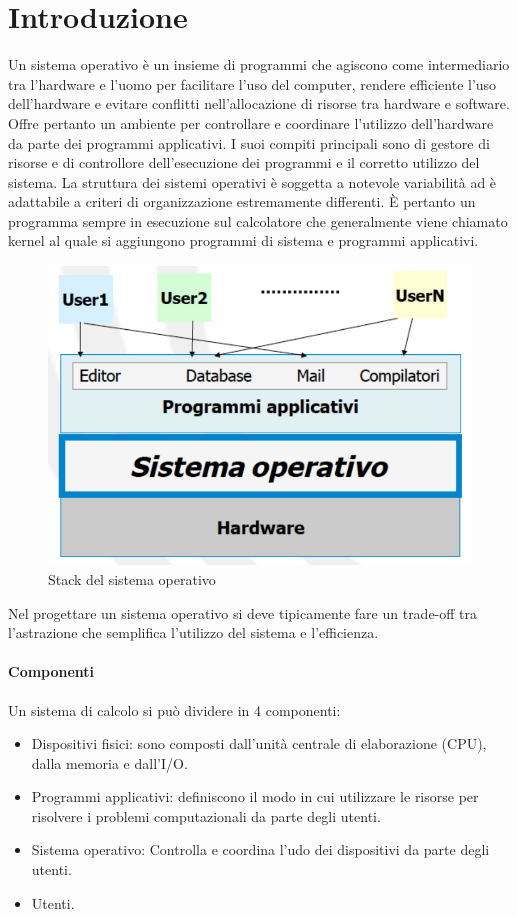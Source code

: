 \chapter{Introduzione}
Un sistema operativo è un insieme di programmi che agiscono come intermediario tra l'hardware e l'uomo per facilitare l'uso del computer, rendere efficiente l'uso dell'hardware e evitare conflitti
nell'allocazione di risorse tra hardware e software. Offre pertanto un ambiente per controllare e coordinare l'utilizzo dell'hardware da parte dei programmi applicativi. I suoi compiti principali sono di gestore di
risorse e di controllore dell'esecuzione dei programmi e il corretto utilizzo del sistema. La struttura dei sistemi operativi \`e soggetta a notevole variabilit\`a ad \`e adattabile a criteri di organizzazione estremamente differenti.
\`E pertanto un programma sempre in esecuzione sul calcolatore che generalmente viene chiamato kernel al quale si aggiungono programmi di sistema e programmi applicativi.
\begin{figure}[h]
	\includegraphics[width=\textwidth]{Pictures/StackSistemaOperativo.png}
	\caption{Stack del sistema operativo}
\end{figure}
Nel progettare un sistema operativo si deve tipicamente fare un trade-off tra l'astrazione che semplifica l'utilizzo del sistema e l'efficienza.
\subsubsection{Componenti}
Un sistema di calcolo si pu\`o dividere in $4$ componenti:
\begin{itemize}
	\item Dispositivi fisici: sono composti dall'unit\`a centrale di elaborazione (CPU), dalla memoria e dall'I/O.
	\item Programmi applicativi: definiscono il modo in cui utilizzare le risorse per risolvere i problemi computazionali da parte degli utenti.
	\item Sistema operativo: Controlla e coordina l'udo dei dispositivi da parte degli utenti.
	\item Utenti.
\end{itemize}
